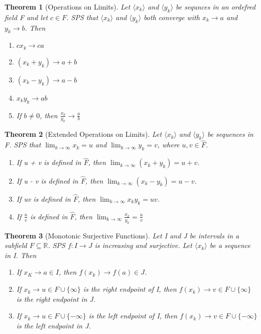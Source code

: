 \documentclass[11pt, oneside]{book}
\theoremstyle{break}
\newtheorem{thm}{Theorem}[section]
\newcommand{\bb}[1]{\mathbb{#1}}			%
\begin{document}
\begin{thm}[Operations on Limits]\label{operations_limits}
	Let $\langle x_k \rangle$ and $\langle y_k \rangle$ be sequnces in an ordefred field F and let $c \in F$. SPS that $\langle x_k \rangle$ and $\langle y_k \rangle$ both converge with $x_k \to a$ and $y_k \to b$. Then
	\begin{enumerate}
		\item $ cx_k \to ca$
		\item $(x_k + y_k) \to a + b$
		\item $(x_k - y_k) \to a - b$
		\item $x_k y_k \to ab$
		\item If $b \neq 0$, then $\frac{x_k}{y_k} \to \frac{a}{b}$
	\end{enumerate}
\end{thm}

\begin{thm}[Extended Operations on Limits]
	Let $\langle x_k \rangle$ and $\langle y_k \rangle$ be sequences in F. SPS that $\lim_{k \to \infty} x_k = u$ and $\lim_{k \to \infty} y_k = v$, where $u, v \in \hat{F}$.
	\begin{enumerate}
		\item If u + v is defined in $\hat{F}$, then $\lim_{k \to \infty} (x_k + y_k) = u + v$.
		\item If u - v is defined in $\hat{F}$, then $\lim_{k \to \infty} (x_k - y_k) = u - v$.
		\item If uv is defined in $\hat{F}$, then $\lim_{k \to \infty} x_k y_k = uv$.
		\item If $\frac{u}{v}$ is defined in $\hat{F}$, then $\lim_{k \to \infty} \frac{x_k}{y_k} = \frac{u}{v}$
	\end{enumerate}
\end{thm}

\begin{thm}[Monotonic Surjective Functions]
	Let I and J be intervals in a subfield $F \subseteq \bb{R}$. SPS $f: I \to J$ is increasing and surjective. Let $\langle x_k \rangle$ be a sequence in I. Then
	\begin{enumerate}
		\item If $x_K \to a \in I$, then $f(x_k) \to f(a) \in J$.
		\item If $x_k \to u \in F \cup \{\infty\}$ is the right endpoint of I, then $f(x_k) \to v \in F \cup \{\infty\}$ is the right endpoint in J.
		\item If $x_k \to u \in F \cup \{-\infty\}$ is the left endpoint of I, then $f(x_k) \to v \in F \cup \{-\infty\}$ is the left endpoint in J.
	\end{enumerate}
\end{thm}
\end{document}
